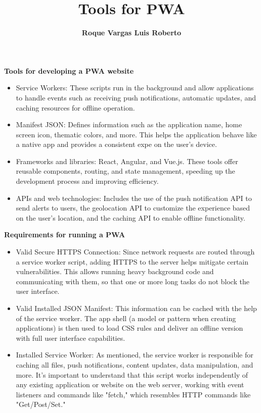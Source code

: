 \documentclass[]{report}
\title{\textbf{\LARGE Tools for PWA}}
\author{\textbf{\LARGE Roque Vargas Luis Roberto}}
\begin{document}
\maketitle
\begin{flushleft}
    \textbf{\LARGE Tools for developing a PWA website}
\end{flushleft}
\begin{flushleft}
    \begin{itemize}
        \item Service Workers: These scripts run in the background and allow applications to handle events such as receiving push notifications, automatic updates, and caching resources for offline operation.
        \item Manifest JSON: Defines information such as the application name, home screen icon, thematic colors, and more. This helps the application behave like a native app and provides a consistent expe
        \maketitlerience on the user's device.
        \item Frameworks and libraries: React, Angular, and Vue.js. These tools offer reusable components, routing, and state management, speeding up the development process and improving efficiency.
        \item APIs and web technologies: Includes the use of the push notification API to send alerts to users, the geolocation API to customize the experience based on the user's location, and the caching API to enable offline functionality.
    \end{itemize}
\end{flushleft}

\begin{flushleft}
    \textbf{\LARGE Requirements for running a PWA}
\end{flushleft}
\begin{flushleft}
    \begin{itemize}
        \item Valid Secure HTTPS Connection: Since network requests are routed through a service worker script, adding HTTPS to the server helps mitigate certain vulnerabilities. This allows running heavy background code and communicating with them, so that one or more long tasks do not block the user interface.
        \item Valid Installed JSON Manifest: This information can be cached with the help of the service worker. The app shell (a model or pattern when creating applications) is then used to load CSS rules and deliver an offline version with full user interface capabilities.
        \item Installed Service Worker: As mentioned, the service worker is responsible for caching all files, push notifications, content updates, data manipulation, and more. It's important to understand that this script works independently of any existing application or website on the web server, working with event listeners and commands like "fetch," which resembles HTTP commands like "Get/Post/Set."
    \end{itemize}
\end{flushleft}
\end{document}
